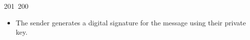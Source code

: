 201~200~\documentclass{article}
\begin{document}
\begin{itemize}
	                                                                                                                                                                                                                                                                                                	                                                                                                                                        	    	                                                                                                	                                                                                                                                                                                                                                                                                                                                	                                                                        	                                                                        	                                                                                                                                        	                                                                                                                                                                                                                        	                                                                                                                            	                                                                	                                                                    \item The sender generates a digital signature for the message using their private key.

\end{itemize}
\end{document}
